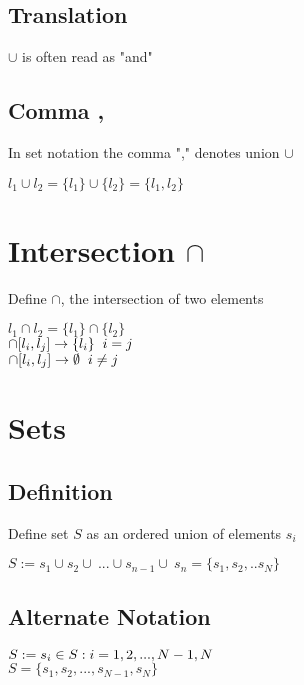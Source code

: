 \documentclass[11pt]{article}
\begin{document}
\subsection{Translation}
$\cup$ is often read as "and"

\subsection{Comma ,}
In set notation the comma "," denotes union $\cup$
\begin{center}
$l_1 \cup l_2 = \{l_1\} \cup \{l_2\} = \{l_1,l_2\}$
\end{center}





\section{Intersection $\cap$}
Define $\cap$, the intersection of two elements
\begin{center}
$l_1 \cap l_2 = \{l_1\} \cap\{ l_2\}$
\\ \vspace{2mm}
$\cap \lbrack l_i,l_j\rbrack \rightarrow \{l_i\} \hspace{2mm} i = j$
\\
$\cap \lbrack l_i,l_j\rbrack \rightarrow \emptyset \hspace{2mm} i \neq j$
\end{center}





\section{Sets}




\subsection{Definition}
Define set $S$ as an ordered union of elements $s_i$

\begin{center}
$
S :=   s_1 \cup  s_2 \cup\ ... \cup s_{n-1} \cup\ s_n = \{s_1,s_2,..s_N\}
$
\end{center}
\subsection{Alternate Notation}
\begin{center}
$
S := s_i \in  S :  i=1,2,...,N-1,N \hspace{5mm}$
\\$
S = \{s_1,s_2,...,s_{N-1},s_N\}
$

\end{center}
\end{document}
